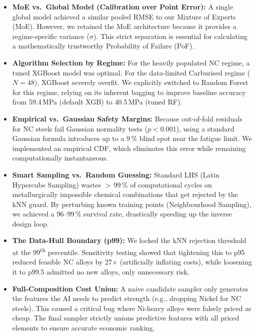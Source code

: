 \documentclass[12pt,a4paper]{article}
\begin{document}
\begin{itemize}
  \item \textbf{MoE vs.\ Global Model (Calibration over Point Error):} A single global model achieved a similar pooled RMSE to our Mixture of Experts (MoE). However, we retained the MoE architecture because it provides a regime-specific variance ($\sigma$). This strict separation is essential for calculating a mathematically trustworthy Probability of Failure (PoF).
  \item \textbf{Algorithm Selection by Regime:} For the heavily populated NC regime, a tuned XGBoost model was optimal. For the data-limited Carburised regime ($N=48$), XGBoost severely overfit. We explicitly switched to Random Forest for this regime, relying on its inherent bagging to improve baseline accuracy from 59.4\,MPa (default XGB) to 40.5\,MPa (tuned RF).
  \item \textbf{Empirical vs.\ Gaussian Safety Margins:} Because out-of-fold residuals for NC steels fail Gaussian normality tests ($p < 0.001$), using a standard Gaussian formula introduces up to a 9\,\% blind spot near the fatigue limit. We implemented an empirical CDF, which eliminates this error while remaining computationally instantaneous.
  \item \textbf{Smart Sampling vs.\ Random Guessing:} Standard LHS (Latin Hypercube Sampling) wastes $>$\,99\,\% of computational cycles on metallurgically impossible chemical combinations that get rejected by the kNN guard. By perturbing known training points (Neighbourhood Sampling), we achieved a 96--99\,\% survival rate, drastically speeding up the inverse design loop.
  \item \textbf{The Data-Hull Boundary (p99):} We locked the kNN rejection threshold at the 99\textsuperscript{th} percentile. Sensitivity testing showed that tightening this to p95 reduced feasible NC alloys by 27$\times$ (artificially inflating costs), while loosening it to p99.5 admitted no new alloys, only unnecessary risk.
  \item \textbf{Full-Composition Cost Union:} A naive candidate sampler only generates the features the AI needs to predict strength (e.g., dropping Nickel for NC steels). This caused a critical bug where Ni-heavy alloys were falsely priced as cheap. The final sampler strictly unions predictive features with all priced elements to ensure accurate economic ranking.
\end{itemize}

\end{document}
